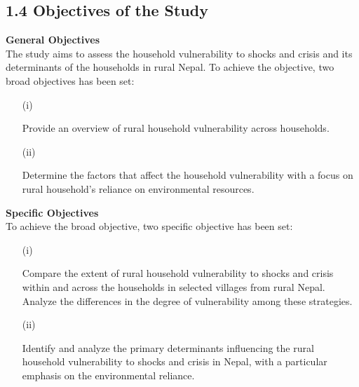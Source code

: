 \documentclass[12pt, a4paper]{article}
\begin{document}
\subsection*{1.4 Objectives of the Study }
\renewcommand{\thepage}{\arabic{page}}
\textbf{General Objectives}
\\
The study aims to assess the household vulnerability to shocks and crisis and its determinants of the households in rural Nepal. To achieve the objective, two broad objectives has been set:
\begin{enumerate}
	\item[(i)] \parbox[t]{\linewidth}{Provide an overview of rural household vulnerability across households.}
	\item [(ii)] \parbox[t]{\linewidth}{Determine the factors that affect the household vulnerability with a focus on rural household's reliance on environmental resources.}
\end{enumerate}
\vspace{1cm}

\textbf{Specific Objectives} 
\\
To achieve the broad objective, two specific objective has been set:
\begin{enumerate}
	\item[(i)] \parbox[t]{\linewidth}{Compare the extent of rural household vulnerability to shocks and crisis within and across the households in selected villages from rural Nepal. Analyze the differences in the degree of vulnerability among these strategies.}

 	\item[(ii)] \parbox[t]{\linewidth}{Identify and analyze the primary determinants influencing the rural household vulnerability to shocks and crisis in Nepal, with a particular emphasis on the environmental reliance.} 
 \end{enumerate}  \\ \vspace{0.5cm}
\end{document}
